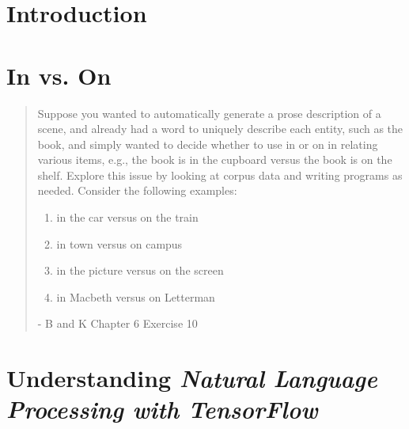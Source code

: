 \documentclass{homework}
\begin{document}
\maketitle

\begin{abstract}
  \noindent 
\end{abstract}

\newpage
\thispagestyle{empty}
\tableofcontents

\newpage
\setcounter{page}{1}
\section{Introduction}

\section{In vs. On}

\begin{quote}
  Suppose you wanted to automatically generate a prose description of a scene,
  and already had a word to uniquely describe each entity, such as the book, and
  simply wanted to decide whether to use in or on in relating various items, e.g., the
  book is in the cupboard versus the book is on the shelf. Explore this issue by looking
  at corpus data and writing programs as needed. Consider the following examples:
  
  \begin{enumerate}
    \item in the car versus on the train
    \item in town versus on campus
    \item in the picture versus on the screen
    \item in Macbeth versus on Letterman
  \end{enumerate}

  - B and K Chapter 6 Exercise 10 
\end{quote}

\section{Understanding \textit{Natural Language Processing with TensorFlow}}
\end{document}
